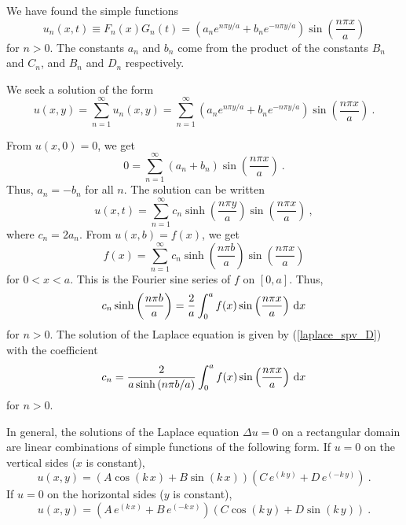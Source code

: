 \begin{egg}
We have found the simple functions
\[
u_n(x,t) \equiv F_n(x)G_n(t) =
\left( a_n e^{n\pi y/a} + b_n e^{-n\pi y/a} \right) 
 \sin\left(\frac{n\pi x}{a}\right)
\]
for $n>0$.
The constants $a_n$ and $b_n$ come from the product of the constants
$B_n$ and $C_n$, and $B_n$ and $D_n$ respectively.

We seek a solution of the form
\[
u(x,y) = \sum_{n=1}^\infty u_n(x,y)
= \sum_{n=1}^\infty \left( a_n e^{n\pi y/a} + b_n e^{-n\pi y/a} \right) 
 \sin\left(\frac{n\pi x}{a}\right) \ .
\]

From $u(x,0) = 0$, we get
\[
0 = \sum_{n=1}^\infty (a_n+b_n) \sin\left(\frac{n\pi x}{a}\right) \ .
\]
Thus, $a_n = -b_n$ for all $n$.  The solution can be written
\begin{equation}\label{laplace_spv_D}
u(x,t) = \sum_{n=1}^\infty c_n \sinh\left(\frac{n\pi y}{a}\right) 
 \sin\left(\frac{n\pi x}{a}\right) \ ,
\end{equation}
where $c_n = 2 a_n$.  From $u(x,b) = f(x)$, we get
\[
f(x) = \sum_{n=1}^\infty c_n \sinh\left(\frac{n\pi b}{a}\right) 
 \sin\left(\frac{n\pi x}{a}\right)
\]
for $0<x<a$.  This is the Fourier sine series of $f$ on $[0,a]$.  Thus,
\[
c_n \sinh\left(\frac{n\pi b}{a}\right) = \frac{2}{a} \int_0^a f(x)
\sin\left(\frac{n\pi x}{a}\right) \,\mathrm{d}{x}
\]
for $n > 0$.
The solution of the Laplace equation is given by (\ref{laplace_spv_D})
with the coefficient
\[
c_n  = \frac{2}{a \sinh\left(n\pi b/a\right)} \int_0^a f(x)
\sin\left(\frac{n\pi x}{a}\right) \,\mathrm{d}{x}
\]
for $n > 0$.
\end{egg}

In general, the solutions of the Laplace equation $\Delta u = 0$ on a
rectangular domain are linear combinations of simple functions of the
following form.  If $u=0$ on the vertical sides ($x$ is constant),
\[
u(x,y) = (A \cos (k\,x) + B \sin (k\,x))(C \,e^{(k\,y)} + D\,e^{(-k\,y)}) \ .
\]
If $u=0$ on the horizontal sides ($y$ is constant),
\[
u(x,y) = (A\,e^{(k\,x)} + B\,e^{(-k\,x)})(C \cos(k\,y) + D \sin(k\,y)) \ .
\]

